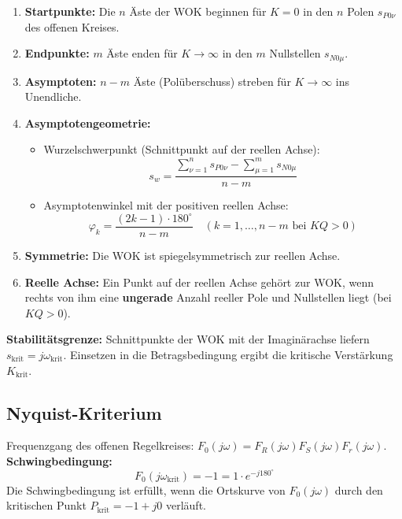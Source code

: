 \begin{tcolorbox}
\begin{enumerate}
  \item \textbf{Startpunkte:} Die $n$ Äste der WOK beginnen für $K = 0$ in den $n$ Polen $s_{P0\nu}$ des offenen Kreises.
  \item \textbf{Endpunkte:} $m$ Äste enden für $K \to \infty$ in den $m$ Nullstellen $s_{N0\mu}$.
  \item \textbf{Asymptoten:} $n - m$ Äste (Polüberschuss) streben für $K \to \infty$ ins Unendliche.
  \item \textbf{Asymptotengeometrie:}
  \begin{itemize}
    \item Wurzelschwerpunkt (Schnittpunkt auf der reellen Achse):
    \[
    s_w = \frac{\sum_{\nu=1}^n s_{P0\nu} - \sum_{\mu=1}^m s_{N0\mu}}{n - m}
    \]
    \item Asymptotenwinkel mit der positiven reellen Achse:
    \[
    \varphi_k = \frac{(2k - 1) \cdot 180^\circ}{n - m} \quad (k = 1, \dots, n-m \text{ bei } KQ > 0)
    \]
  \end{itemize}
  \item \textbf{Symmetrie:} Die WOK ist spiegelsymmetrisch zur reellen Achse.
  \item \textbf{Reelle Achse:} Ein Punkt auf der reellen Achse gehört zur WOK, wenn rechts von ihm eine \textbf{ungerade} Anzahl reeller Pole und Nullstellen liegt (bei $KQ > 0$).
\end{enumerate}
\textbf{Stabilitätsgrenze:} Schnittpunkte der WOK mit der Imaginärachse liefern $s_{\text{krit}} = j\omega_{\text{krit}}$. Einsetzen in die Betragsbedingung ergibt die kritische Verstärkung $K_{\text{krit}}$.
\end{tcolorbox}

\subsection{Nyquist-Kriterium}
\begin{tcolorbox}
Frequenzgang des offenen Regelkreises: $F_0(j\omega) = F_R(j\omega) F_S(j\omega) F_r(j\omega)$.\\[2pt]
\textbf{Schwingbedingung:}
\[
F_0(j\omega_{\text{krit}}) = -1 = 1 \cdot e^{-j 180^\circ}
\]
Die Schwingbedingung ist erfüllt, wenn die Ortskurve von $F_0(j\omega)$ durch den kritischen Punkt $P_{\text{krit}} = -1 + j0$ verläuft.
\end{tcolorbox}

